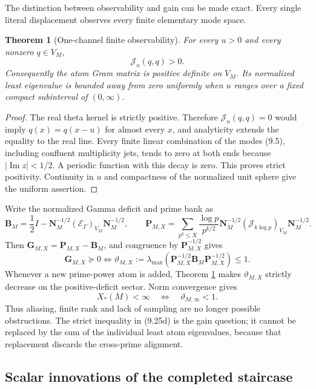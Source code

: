 \documentclass[11pt]{amsart}
\newtheorem{theorem}{Theorem}[section]
\theoremstyle{definition}
\theoremstyle{remark}
\begin{document}
The distinction between observability and gain can be made exact.  Every
single literal displacement observes every finite elementary mode space.

\begin{theorem}[One-channel finite observability]
\label{thm:one-channel-observability}
For every \(u>0\) and every nonzero \(q\in V_M\),
\[
 \boxed{\mathcal J_u(q,q)>0.}
\tag{9.25a}
\]
Consequently the atom Gram matrix is positive definite on \(V_M\).  Its
normalized least eigenvalue is bounded away from zero uniformly when
\(u\) ranges over a fixed compact subinterval of \((0,\infty)\).
\end{theorem}

\begin{proof}
The real theta kernel is strictly positive.  Therefore
\(\mathcal J_u(q,q)=0\) would imply
\(q(x)=q(x-u)\) for almost every \(x\), and analyticity extends the equality
to the real line.  Every finite linear combination of the modes (9.5),
including confluent multiplicity jets, tends to zero at both ends because
\(\lvert\operatorname {Im}z\rvert<1/2\).  A periodic function with this
decay is zero.  This proves strict positivity.  Continuity in \(u\) and
compactness of the normalized unit sphere give the uniform assertion.
\end{proof}

Write the normalized Gamma deficit and prime bank as
\[
 \mathbf B_M=\frac12I-
 \mathbf N_M^{-1/2}(\mathscr E_\Gamma)_{V_M}\mathbf N_M^{-1/2},
 \qquad
 \mathbf P_{M,X}=\sum_{p^k\le X}\frac{\log p}{p^{k/2}}
 \mathbf N_M^{-1/2}(\mathcal J_{k\log p})_{V_M}\mathbf N_M^{-1/2}.
\tag{9.25b}
\]
Then \(\mathbf G_{M,X}=\mathbf P_{M,X}-\mathbf B_M\), and congruence by
\(\mathbf P_{M,X}^{-1/2}\) gives
\[
 \boxed{
 \mathbf G_{M,X}\succeq0
 \Longleftrightarrow
 \vartheta_{M,X}:=
 \lambda_{\max}(\mathbf P_{M,X}^{-1/2}
 \mathbf B_M\mathbf P_{M,X}^{-1/2})\le1.}
\tag{9.25c}
\]
Whenever a new prime-power atom is added, Theorem
\ref{thm:one-channel-observability} makes \(\vartheta_{M,X}\) strictly
decrease on the positive-deficit sector.  Norm convergence gives
\[
 \boxed{X_*(M)<\infty\quad\Longleftrightarrow\quad
 \vartheta_{M,\infty}<1.}
\tag{9.25d}
\]
Thus aliasing, finite rank and lack of sampling are no longer possible
obstructions.  The strict inequality in (9.25d) is the gain question; it
cannot be replaced by the sum of the individual least atom eigenvalues,
because that replacement discards the cross-prime alignment.

\subsection{Scalar innovations of the completed staircase}
\end{document}
